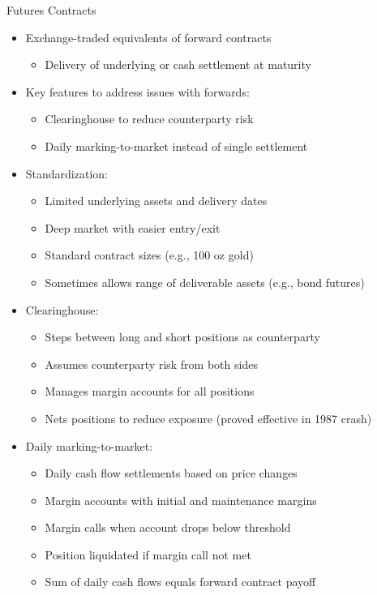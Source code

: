 \documentclass[10pt,handout]{beamer}
\begin{document}
\begin{frame}{Futures Contracts}
  \begin{itemize}[<+->]
    \item Exchange-traded equivalents of forward contracts
      \begin{itemize}
        \item Delivery of underlying or cash settlement at maturity
      \end{itemize}
    \item Key features to address issues with forwards:
      \begin{itemize}
        \item Clearinghouse to reduce counterparty risk
        \item Daily marking-to-market instead of single settlement
      \end{itemize}
    \item Standardization:
      \begin{itemize}
        \item Limited underlying assets and delivery dates
        \item Deep market with easier entry/exit
        \item Standard contract sizes (e.g., 100 oz gold)
        \item Sometimes allows range of deliverable assets (e.g., bond futures)
      \end{itemize}
    \item Clearinghouse:
      \begin{itemize}
        \item Steps between long and short positions as counterparty
        \item Assumes counterparty risk from both sides
        \item Manages margin accounts for all positions
        \item Nets positions to reduce exposure (proved effective in 1987 crash)
      \end{itemize}
    \item Daily marking-to-market:
      \begin{itemize}
        \item Daily cash flow settlements based on price changes
        \item Margin accounts with initial and maintenance margins
        \item Margin calls when account drops below threshold
        \item Position liquidated if margin call not met
        \item Sum of daily cash flows equals forward contract payoff
      \end{itemize}
  \end{itemize}
\end{frame}
\end{document}
